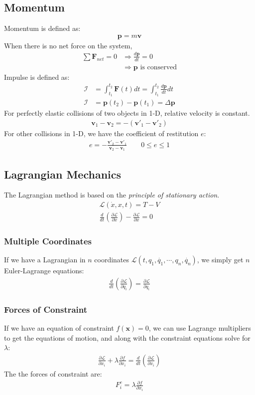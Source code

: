 \documentclass[a4paper]{article}
\newcommand{\Lagr}{\mathcal{L}}	       %
\newcommand{\Imp}{\mathcal{I}}	       %
\newcommand{\ve}[1]{
  \ensuremath{\bm{#1}}}	               %
\newcommand{\pd}[2]{
  \ensuremath{
    \frac{\partial #1}{\partial #2} }} %
\begin{document}
\begin{multicols*}{2}
\subsection{Momentum}
Momentum is defined as:
\begin{align*}
  \ve{p} = m \ve{v}
\end{align*}
When there is no net force on the system,
\begin{align*}
  \sum \ve{F}_{net} = 0 &\Rightarrow \frac{d\ve{p}}{dt} = 0 \\
  &\Rightarrow \ve{p} \text{ is conserved}
\end{align*}
Impulse is defined as:
\begin{align*}
  \Imp &= \int_{t_1}^{t_2} \ve{F}(t) dt = \int_{t_1}^{t_2} \frac{d\ve{p}}{dt} dt \\
  \Imp &= \ve{p}(t_2) - \ve{p}(t_1) = \Delta \ve{p}
\end{align*}
For perfectly elastic collisions of two objects in 1-D, relative velocity is
constant.
\begin{align*}
  \ve{v}_1 - \ve{v}_2 = - (\ve{v}'_1 - \ve{v}'_2)
\end{align*}
For other collisions in 1-D, we have the coefficient of restitution $e$:
\begin{align*}
  e = -\frac{\ve{v}'_2 - \ve{v}'_1}{\ve{v}_2 - \ve{v}_1} \qquad 0 \leq e \leq 1
\end{align*}
\subsection{Lagrangian Mechanics}
The Lagrangian method is based on the \emph{principle of stationary action}.
\begin{align*}
  \Lagr(\dot{x},x,t) = T - V \\
  \frac{d}{dt}\left( \pd{\Lagr}{\dot{x}} \right) - \pd{\Lagr}{x} = 0
\end{align*}
\subsubsection{Multiple Coordinates}
If we have a Lagrangian in $n$ coordinates $\Lagr(t, q_1, \dot{q_1}, \cdots,
q_n, \dot{q_n})$, we simply get $n$ Euler-Lagrange equations:
\begin{align*}
  \frac{d}{dt}\left( \pd{\Lagr}{\dot{q}_i} \right) = \pd{\Lagr}{q_i}
\end{align*}
\subsubsection{Forces of Constraint}
If we have an equation of constraint $f(\ve{x}) = 0$, we can use Lagrange
multipliers to get the equations of motion, and along with the constraint
equations solve for $\lambda$:
\begin{align*}
  \pd{\Lagr}{x_i} + \lambda \pd{f}{x_i} = \frac{d}{dt} \left(
    \pd{\Lagr}{\dot{x}_i} \right)
\end{align*}
The the forces of constraint are:
\begin{align*}
  F_i^c = \lambda \pd{f}{x_i}
\end{align*}

\end{multicols*}
\end{document}

